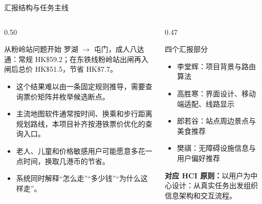 \documentclass[aspectratio=169,10pt]{beamer}
\newcommand{\hciprinciple}[1]{\vspace{0.25em}\textcolor{MTRPurple}{\small\textbf{对应 HCI 原则：}#1}}
\begin{document}
\begin{frame}{汇报结构与任务主线}
  \small
  \begin{columns}[T,onlytextwidth]
    \begin{column}{0.50\textwidth}
      \begin{block}{从粉岭站问题开始}
        罗湖 $\to$ 屯门，成人八达通：常规 HK\$59.2；在东铁线粉岭站出闸再入闸后总价 HK\$51.5，节省 HK\$7.7。
      \end{block}
      \begin{itemize}
        \item 这个结果难以由一条固定规则推导，需要查询票价矩阵并枚举候选断点。
        \item 主流地图软件通常按时间、换乘和步行距离规划路线，本项目补齐按港铁票价优化的查询入口。
        \item 老人、儿童和价格敏感用户可能愿意多花一点时间，换取几港币的节省。
        \item 系统同时解释“怎么走”“多少钱”“为什么这样走”。
      \end{itemize}
    \end{column}
    \begin{column}{0.47\textwidth}
      \begin{block}{四个汇报部分}
        \begin{itemize}
          \item 李堂辉：项目背景与路由算法
          \item 高胜寒：界面设计、移动端适配、线路显示
          \item 郎若谷：站点周边景点与美食推荐
          \item 樊祺：无障碍设施信息与用户偏好推荐
        \end{itemize}
      \end{block}
      \begin{center}
      \end{center}
      \hciprinciple{以用户为中心设计：从真实任务出发组织信息架构和交互流程。}
    \end{column}
  \end{columns}
\end{frame}
\end{document}
